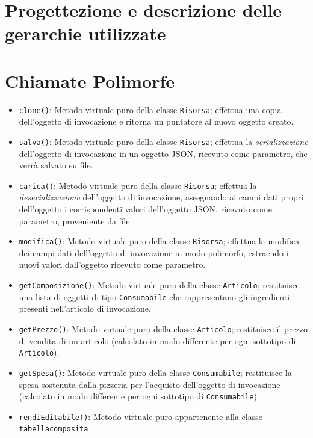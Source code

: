 \documentclass[
]{article}
\providecommand{\tightlist}{%
  \setlength{\itemsep}{0pt}\setlength{\parskip}{0pt}}
\begin{document}
\hypertarget{progettezione-e-descrizione-delle-gerarchie-utilizzate}{%
\section{Progettezione e descrizione delle gerarchie
utilizzate}\label{progettezione-e-descrizione-delle-gerarchie-utilizzate}}

\hypertarget{chiamate-polimorfe}{%
\section{Chiamate Polimorfe}\label{chiamate-polimorfe}}

\begin{itemize}
\tightlist
\item
  \texttt{clone()}: Metodo virtuale puro della classe \texttt{Risorsa};
  effettua una copia dell'oggetto di invocazione e ritorna un puntatore
  al nuovo oggetto creato.
\item
  \texttt{salva()}: Metodo virtuale puro della classe \texttt{Risorsa};
  effettua la \emph{serializzazione} dell'oggetto di invocazione in un
  oggetto JSON, ricevuto come parametro, che verrà salvato su file.
\item
  \texttt{carica()}: Metodo virtuale puro della classe \texttt{Risorsa};
  effettua la \emph{deserializzazione} dell'oggetto di invocazione,
  assegnando ai campi dati propri dell'oggetto i corrispondenti valori
  dell'oggetto JSON, ricevuto come parametro, proveniente da file.
\item
  \texttt{modifica()}: Metodo virtuale puro della classe
  \texttt{Risorsa}; effettua la modifica dei campi dati dell'oggetto di
  invocazione in modo polimorfo, estraendo i nuovi valori dall'oggetto
  ricevuto come parametro.
\item
  \texttt{getComposizione()}: Metodo virtuale puro della classe
  \texttt{Articolo}; restituisce una lista di oggetti di tipo
  \texttt{Consumabile} che rappresentano gli ingredienti presenti
  nell'articolo di invocazione.
\item
  \texttt{getPrezzo()}: Metodo virtuale puro della classe
  \texttt{Articolo}; restituisce il prezzo di vendita di un articolo
  (calcolato in modo differente per ogni sottotipo di
  \texttt{Articolo}).
\item
  \texttt{getSpesa()}: Metodo virtuale puro della classe
  \texttt{Consumabile}; restituisce la spesa sostenuta dalla pizzeria
  per l'acquisto dell'oggetto di invocazione (calcolato in modo
  differente per ogni sottotipo di \texttt{Consumabile}).
\item
  \texttt{rendiEditabile()}: Metodo virtuale puro appartenente alla
  classe \texttt{tabellacomposita}
\end{itemize}
\end{document}

